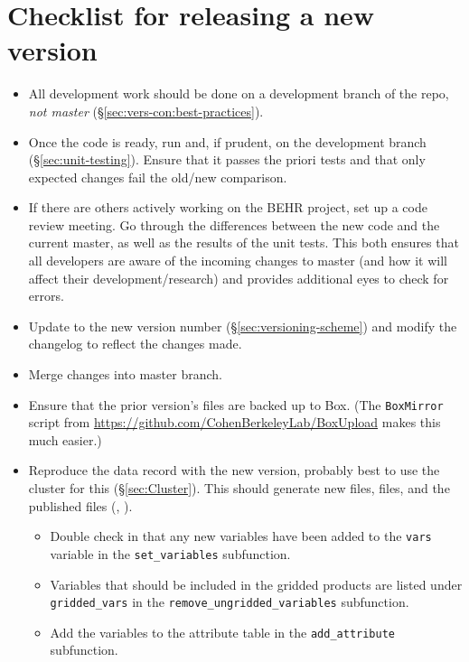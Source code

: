 \documentclass[12pt]{article}
\begin{document}
\section{Checklist for releasing a new version}
\begin{itemize}
\item All development work should be done on a development branch of the repo, \emph{not master} (\S\ref{sec:vers-con:best-practices}).

\item Once the code is ready, run  and, if prudent,  on the development branch (\S\ref{sec:unit-testing}). Ensure that it passes the priori tests and that only expected changes fail the old/new comparison.

\item If there are others actively working on the BEHR project, set up a code review meeting. Go through the differences between the new code and the current master, as well as the results of the unit tests.  This both ensures that all developers are aware of the incoming changes to master (and how it will affect their development/research) and provides additional eyes to check for errors.

\item Update  to the new version number (\S\ref{sec:versioning-scheme}) and modify the changelog to reflect the changes made.

\item Merge changes into master branch.

\item Ensure that the prior version's  files are backed up to Box. (The \lstinline$BoxMirror$ script from \url{https://github.com/CohenBerkeleyLab/BoxUpload} makes this much easier.)

\item Reproduce the data record with the new version, probably best to use the cluster for this (\S\ref{sec:Cluster}).  This should generate new  files,  files, and the published files (, ).

	\begin{itemize}
	\item Double check in  that any new variables have been added to the \lstinline$vars$ variable in the \lstinline$set_variables$ subfunction.
	\item Variables that should be included in the gridded products are listed under \lstinline$gridded_vars$ in the \lstinline$remove_ungridded_variables$ subfunction.
	\item Add the variables to the attribute table in the \lstinline$add_attribute$ subfunction.
	\end{itemize}


\end{itemize}
\end{document}
